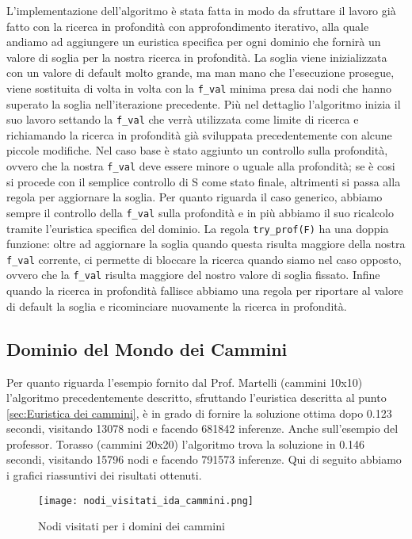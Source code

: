 L'implementazione dell'algoritmo è stata fatta in modo da sfruttare il lavoro già fatto con la ricerca in profondità con approfondimento iterativo, alla quale andiamo ad aggiungere un euristica specifica per ogni dominio che fornirà un valore di soglia per la nostra ricerca in profondità.
La soglia viene inizializzata con un valore di default molto grande, ma man mano che l'esecuzione prosegue, viene sostituita di volta in volta con la \lstinline{f_val} minima presa dai nodi che hanno superato la soglia nell'iterazione precedente.
Più nel dettaglio l'algoritmo inizia il suo lavoro settando la \lstinline{f_val} che verrà utilizzata come limite di ricerca e richiamando la ricerca in profondità già sviluppata precedentemente con alcune piccole modifiche.
Nel caso base è stato aggiunto un controllo sulla profondità, ovvero che la nostra \lstinline{f_val} deve essere minore o uguale alla profondità; se è cosi si procede con il semplice controllo di S come stato finale, altrimenti si passa alla regola per aggiornare la soglia.
Per quanto riguarda il caso generico, abbiamo sempre il controllo della \lstinline{f_val} sulla profondità e in più abbiamo il suo ricalcolo tramite l'euristica specifica del dominio. La regola \lstinline{try_prof(F)} ha una doppia funzione: oltre ad aggiornare la soglia quando questa risulta maggiore della nostra \lstinline{f_val} corrente, ci permette di bloccare la ricerca quando siamo nel caso opposto, ovvero che la \lstinline{f_val} risulta maggiore del nostro valore di soglia fissato. Infine quando la ricerca in profondità fallisce abbiamo una regola per riportare al valore di default la soglia e ricominciare nuovamente la ricerca in profondità.
\subsection{Dominio del Mondo dei Cammini}
Per quanto riguarda l'esempio fornito dal Prof. Martelli (cammini 10x10) l'algoritmo precedentemente descritto, sfruttando l'euristica descritta al punto \ref{sec:Euristica dei cammini}, è in grado di fornire la soluzione ottima dopo 0.123 secondi, visitando 13078 nodi e facendo 681842 inferenze. Anche sull'esempio del professor. Torasso (cammini 20x20) l'algoritmo trova la soluzione in 0.146 secondi, visitando 15796 nodi e facendo 791573 inferenze.
Qui di seguito abbiamo i grafici riassuntivi dei risultati ottenuti.
\newpage
\begin{figure}[!htp] 
  \centering
  \texttt{[image: nodi\_visitati\_ida\_cammini.png]}
  \caption{Nodi visitati per i domini dei cammini}
  \label{fig:figure9}
\end{figure}

